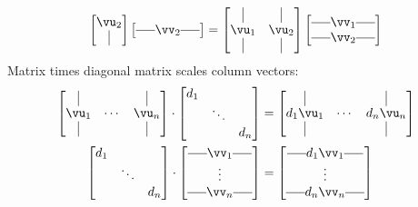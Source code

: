 \documentclass[a4paper,11pt]{exam}
\newcounter{ct}
\newcommand{\horzbar}{\rule[.5ex]{1.5em}{0.4pt}}
\begin{document}
\begin{questions}
\begin{tcolorbox}[colback=black!1!,title=Matrix Fun Facts]
\begin{align}
\begin{bmatrix}
	\vu_2 \\
	\kern.3em\vline\kern.3em
    \end{bmatrix}
    \begin{bmatrix}
	\horzbar \vv_2 \horzbar
    \end{bmatrix}
    =
    \begin{bmatrix}
	\kern.3em\vline\kern.3em
	&
	\kern.3em\vline\kern.3em
	\\
	\vu_1 & \vu_2 \\
	\kern.3em\vline\kern.3em
	&
	\kern.3em\vline\kern.3em
    \end{bmatrix}
    \begin{bmatrix}
	\horzbar \vv_1 \horzbar \\
	\horzbar \vv_2 \horzbar
    \end{bmatrix}
\end{align}
%
Matrix times diagonal matrix scales column vectors:
\begin{align}
    \begin{bmatrix}
	\kern.3em\vline\kern.3em
	&
	&
	\kern.3em\vline\kern.3em
	\\
	\vu_1 & \cdots & \vu_n \\
	\kern.3em\vline\kern.3em
	&
	&
	\kern.3em\vline\kern.3em
    \end{bmatrix}
    \cdot
    \begin{bmatrix}
	d_1 & & \\
	    & \ddots & \\
	    & & d_n
    \end{bmatrix}
    &=
    \begin{bmatrix}
	\kern.3em\vline\kern.3em
	&
	&
	\kern.3em\vline\kern.3em
	\\
	d_1 \vu_1 & \cdots & d_n \vu_n \\
	\kern.3em\vline\kern.3em
	&
	&
	\kern.3em\vline\kern.3em
    \end{bmatrix}
    \\
    \begin{bmatrix}
	d_1 & & \\
	    & \ddots & \\
	    & & d_n
    \end{bmatrix}
    \cdot
    \begin{bmatrix}
	\horzbar \vv_1 \horzbar \\
	\vdots \\
	\horzbar \vv_n \horzbar
    \end{bmatrix}
    &=
    \begin{bmatrix}
	\horzbar d_1 \vv_1 \horzbar \\
	\vdots \\
	\horzbar d_n \vv_n \horzbar
    \end{bmatrix}
\end{align}
\end{tcolorbox}


\end{questions}
\end{document}
